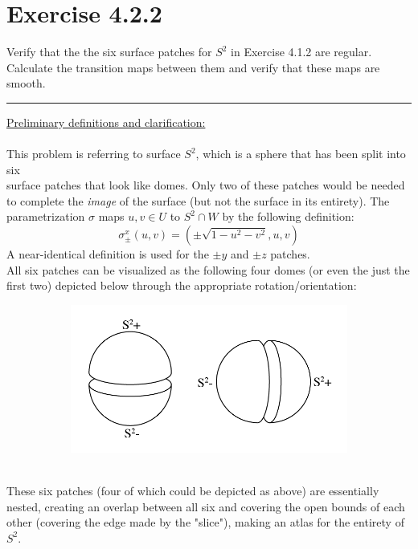 \documentclass[12pt]{article}
\begin{document}
\maketitle

\section*{Exercise 4.2.2}
Verify that the the six surface patches for $S^2$ in Exercise 4.1.2 are regular. Calculate the transition maps between them and verify that these maps are smooth.

\vspace{1cm}
\hrule
\vspace{1cm}
\noindent
\underline{Preliminary definitions and clarification:}\\\\
This problem is referring to surface $S^2$, which is a sphere that has been split into six \\ surface patches that look like domes. Only two of these patches would be needed to complete the \emph{image} of the surface (but not the surface in its entirety). The parametrization $\sigma$ maps $u,v \in U$ to $S^2 \cap W$ by the following definition:
$$
\sigma^{x}_{\pm}(u,v) = (\pm \sqrt{1-u^2-v^2}, u ,v)
$$
\indent
A near-identical definition is used for the $\pm y$ and $\pm z$ patches.\\
\indent
All six patches can be visualized as the following four domes (or even the just the first two) depicted below through the appropriate rotation/orientation:
\begin{figure}[h!]
  \centering
      \begin{subfigure}[b]{0.5\linewidth}
    \includegraphics[width=\linewidth]{./assets/4-2-2/s2-patches.png}
  \end{subfigure}
  \end{figure}
  \\
These six patches (four of which could be depicted as above) are essentially nested, creating an overlap between all six and covering the open bounds of each other (covering the edge made by the "slice"), making an atlas for the entirety of $S^2$.
\end{document}
